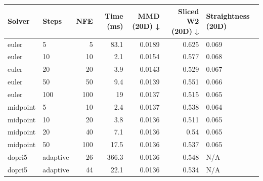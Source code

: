 \begin{tabular}{llrrrrl}
\toprule
Solver & Steps & NFE & Time (ms) & MMD (20D) ↓ & Sliced W2 (20D) ↓ & Straightness (20D) \\
\midrule
euler & 5 & 5 & 83.1 & 0.0189 & 0.625 & 0.069 \\
euler & 10 & 10 & 2.1 & 0.0154 & 0.577 & 0.068 \\
euler & 20 & 20 & 3.9 & 0.0143 & 0.529 & 0.067 \\
euler & 50 & 50 & 9.4 & 0.0139 & 0.551 & 0.066 \\
euler & 100 & 100 & 19 & 0.0137 & 0.515 & 0.065 \\
midpoint & 5 & 10 & 2.4 & 0.0137 & 0.538 & 0.064 \\
midpoint & 10 & 20 & 3.8 & 0.0136 & 0.511 & 0.065 \\
midpoint & 20 & 40 & 7.1 & 0.0136 & 0.54 & 0.065 \\
midpoint & 50 & 100 & 17.5 & 0.0136 & 0.537 & 0.065 \\
dopri5 & adaptive & 26 & 366.3 & 0.0136 & 0.548 & N/A \\
dopri5 & adaptive & 44 & 22.1 & 0.0136 & 0.534 & N/A \\
\bottomrule
\end{tabular}
